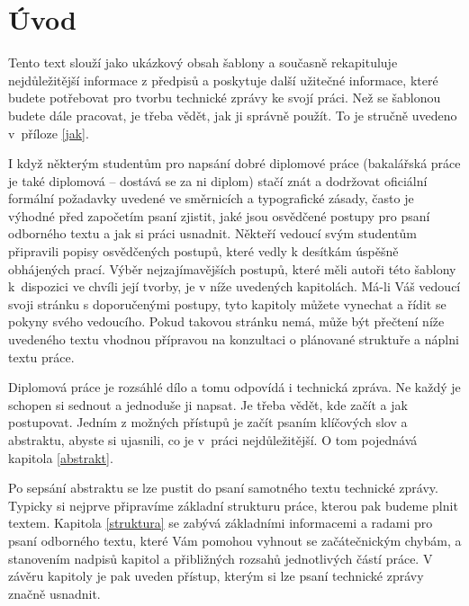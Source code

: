 \chapter{Úvod}

Tento text slouží jako ukázkový obsah šablony a současně rekapituluje nejdůležitější informace z předpisů a poskytuje další užitečné informace, které budete potřebovat pro tvorbu technické zprávy ke svojí práci. Než se šablonou budete dále pracovat, je třeba vědět, jak ji správně použít. To je stručně uvedeno v~příloze \ref{jak}.

I když některým studentům pro napsání dobré diplomové práce (bakalářská práce je také diplomová -- dostává se za ni diplom) stačí znát a dodržovat oficiální formální požadavky uvedené ve směrnicích a typografické zásady, často je výhodné před započetím psaní zjistit, jaké jsou osvědčené postupy pro psaní odborného textu a jak si práci usnadnit. Někteří vedoucí svým studentům připravili popisy osvědčených postupů, které vedly k desítkám úspěšně obhájených prací. Výběr nejzajímavějších postupů, které měli autoři této šablony k~dispozici ve chvíli její tvorby, je v níže uvedených kapitolách. Má-li Váš vedoucí svoji stránku s doporučenými postupy, tyto kapitoly můžete vynechat a řídit se pokyny svého vedoucího. Pokud takovou stránku nemá, může být přečtení níže uvedeného textu vhodnou přípravou na konzultaci o plánované struktuře a náplni textu práce.

Diplomová práce je rozsáhlé dílo a tomu odpovídá i technická zpráva. Ne každý je schopen si sednout a jednoduše ji napsat. Je třeba vědět, kde začít a jak postupovat. Jedním z možných přístupů je začít psaním klíčových slov a abstraktu, abyste si ujasnili, co je v~práci nejdůležitější. O tom pojednává kapitola \ref{abstrakt}.

Po sepsání abstraktu se lze pustit do psaní samotného textu technické zprávy. Typicky si nejprve připravíme základní strukturu práce, kterou pak budeme plnit textem. Kapitola \ref{struktura} se zabývá základními informacemi a radami pro psaní odborného textu, které Vám pomohou vyhnout se začátečnickým chybám, a stanovením nadpisů kapitol a přibližných rozsahů jednotlivých částí práce. V závěru kapitoly je pak uveden přístup, kterým si lze psaní technické zprávy značně usnadnit.


